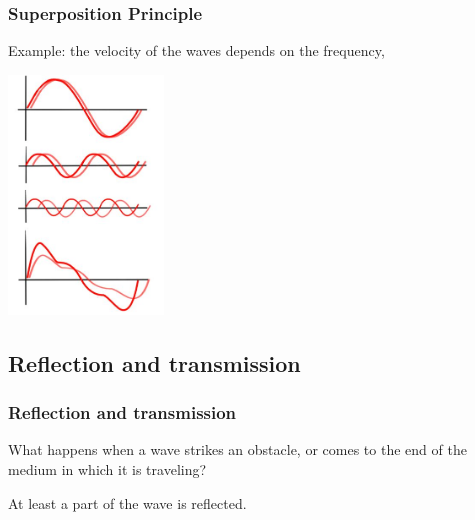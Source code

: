 \documentclass[]{beamer}
\begin{document}


\begin{frame}
\frametitle{Superposition Principle}

Example: the velocity of the waves depends on the frequency,

  \begin{center}
  \includegraphics[height=2.5in]{images4/dispersion2.jpg}
\end{center}


  \end{frame}

\subsection{Reflection and transmission}
\begin{frame}
\frametitle{Reflection and transmission }

What happens when  a wave strikes an obstacle, or comes to the end of the medium in which it is
traveling?
\pause
\vspace{3mm}

At least a part of the wave is reflected.


  \end{frame}



\end{document}

